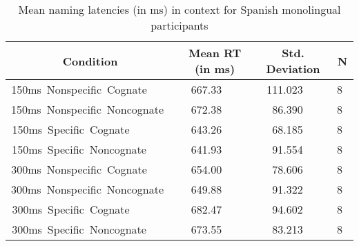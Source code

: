 %
\begin{table}[hptb]
\begin{center}
\begin{tabular}{|c|c|c|c|} \hline
\multicolumn{1}{|c|}{Condition}&\multicolumn{1}{c|}{Mean RT (in ms)}&\multicolumn{1}{c|}{Std. Deviation}&\multicolumn{1}{c|}{N}\\ \hline\hline
150ms~Nonspecific~Cognate~~~~&667.33~~~&111.023~~~&8~\\ 
150ms~Nonspecific~Noncognate~&672.38~~~&~86.390~~~&8~\\ 
\hline
150ms~Specific~Cognate~~~~~~~&643.26~~~&~68.185~~~&8~\\ 
150ms~Specific~Noncognate~~~~&641.93~~~&~91.554~~~&8~\\ 
\hline\hline
300ms~Nonspecific~Cognate~~~~&654.00~~~&~78.606~~~&8~\\ 
300ms~Nonspecific~Noncognate~&649.88~~~&~91.322~~~&8~\\ 
\hline
300ms~Specific~Cognate~~~~~~~&682.47~~~&~94.602~~~&8~\\ 
300ms~Specific~Noncognate~~~~&673.55~~~&~83.213~~~&8~\\ 
\hline
\end{tabular}
\caption{Mean naming latencies (in ms) in context for Spanish monolingual participants}\label{smono_means}
\end{center}
\end{table}

